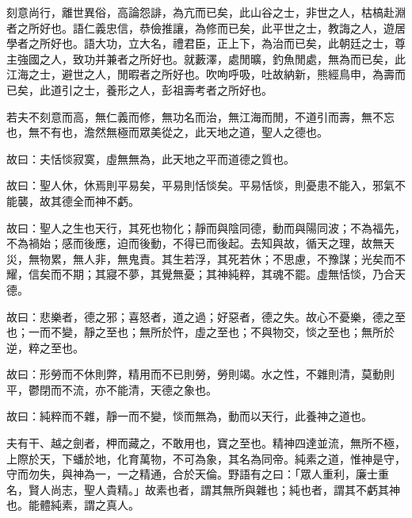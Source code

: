 
\begin{pinyinscope}
刻意尚行，離世異俗，高論怨誹，為亢而已矣，此山谷之士，非世之人，枯槁赴淵者之所好也。語仁義忠信，恭儉推讓，為修而已矣，此平世之士，教誨之人，遊居學者之所好也。語大功，立大名，禮君臣，正上下，為治而已矣，此朝廷之士，尊主強國之人，致功并兼者之所好也。就藪澤，處閒曠，釣魚閒處，無為而已矣，此江海之士，避世之人，閒暇者之所好也。吹呴呼吸，吐故納新，熊經鳥申，為壽而已矣，此道引之士，養形之人，彭祖壽考者之所好也。

若夫不刻意而高，無仁義而修，無功名而治，無江海而閒，不道引而壽，無不忘也，無不有也，澹然無極而眾美從之，此天地之道，聖人之德也。

故曰：夫恬惔寂寞，虛無無為，此天地之平而道德之質也。

故曰：聖人休，休焉則平易矣，平易則恬惔矣。平易恬惔，則憂患不能入，邪氣不能襲，故其德全而神不虧。

故曰：聖人之生也天行，其死也物化；靜而與陰同德，動而與陽同波；不為福先，不為禍始；感而後應，迫而後動，不得已而後起。去知與故，循天之理，故無天災，無物累，無人非，無鬼責。其生若浮，其死若休；不思慮，不豫謀；光矣而不耀，信矣而不期；其寢不夢，其覺無憂；其神純粹，其魂不罷。虛無恬惔，乃合天德。

故曰：悲樂者，德之邪；喜怒者，道之過；好惡者，德之失。故心不憂樂，德之至也；一而不變，靜之至也；無所於忤，虛之至也；不與物交，惔之至也；無所於逆，粹之至也。

故曰：形勞而不休則弊，精用而不已則勞，勞則竭。水之性，不雜則清，莫動則平，鬱閉而不流，亦不能清，天德之象也。

故曰：純粹而不雜，靜一而不變，惔而無為，動而以天行，此養神之道也。

夫有干、越之劍者，柙而藏之，不敢用也，寶之至也。精神四達並流，無所不極，上際於天，下蟠於地，化育萬物，不可為象，其名為同帝。純素之道，惟神是守，守而勿失，與神為一，一之精通，合於天倫。野語有之曰：「眾人重利，廉士重名，賢人尚志，聖人貴精。」故素也者，謂其無所與雜也；純也者，謂其不虧其神也。能體純素，謂之真人。


\end{pinyinscope}